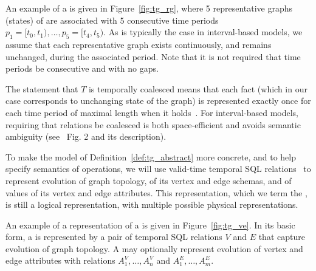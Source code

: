 An example of a \tg is given in Figure~\ref{fig:tg_rg}, where 5
representative graphs (states) of  are associated with 5
consecutive time periods $p_1=[t_0,t_1), \ldots, p_5=[t_4,t_5)$.  
%
As is typically the case in interval-based models, we assume that each
representative graph exists continuously, and remains unchanged,
during the associated period.  Note that it is not required that time
periods be consecutive and with no gaps.

The statement that $T$ is temporally coalesced means that each fact
(which in our case corresponds to unchanging state of the graph) is
represented exactly once for each time period of maximal length when
it holds~\cite{DBLP:conf/vldb/BohlenSS96}.  For interval-based models,
requiring that relations be coalesced is both space-efficient and
avoids semantic ambiguity (see~\cite{DBLP:reference/db/JensenS09k}
Fig. 2 and its description).

To make the model of Definition~\ref{def:tg_abstract} more concrete,
and to help specify semantics of \tg operations, we will use
valid-time temporal SQL relations~\cite{DBLP:conf/vldb/BohlenSS96} to
represent evolution of graph topology, of its vertex and edge schemas,
and of values of its vertex and edge attributes.  This representation,
which we term the {\em \ve \tg}, is still a logical representation,
with multiple possible physical representations.

An example of a \ve representation of a \tg is given in
Figure~\ref{fig:tg_ve}.  In its basic form, a \tg is represented by a
pair of temporal SQL relations $V$ and $E$ that capture evolution of
graph topology.  A \tg may optionally represent evolution of vertex
and edge attributes with relations $A^{V}_1, \ldots, A^{V}_n$ and
$A^{E}_1, \ldots, A^{E}_m$.


